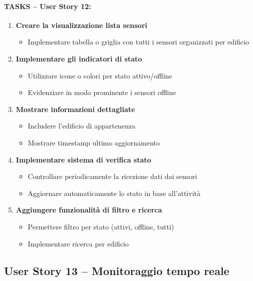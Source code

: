 \paragraph*{TASKS – User Story 12:}
\begin{enumerate}
    \item \textbf{Creare la visualizzazione lista sensori}
    \begin{itemize}
        \item Implementare tabella o griglia con tutti i sensori organizzati per edificio
    \end{itemize}
    \item \textbf{Implementare gli indicatori di stato}
    \begin{itemize}
        \item Utilizzare icone o colori per stato attivo/offline
        \item Evidenziare in modo prominente i sensori offline
    \end{itemize}
    \item \textbf{Mostrare informazioni dettagliate}
    \begin{itemize}
        \item Includere l'edificio di appartenenza
        \item Mostrare timestamp ultimo aggiornamento
    \end{itemize}
    \item \textbf{Implementare sistema di verifica stato}
    \begin{itemize}
        \item Controllare periodicamente la ricezione dati dai sensori
        \item Aggiornare automaticamente lo stato in base all'attività
    \end{itemize}
    \item \textbf{Aggiungere funzionalità di filtro e ricerca}
    \begin{itemize}
        \item Permettere filtro per stato (attivi, offline, tutti)
        \item Implementare ricerca per edificio
    \end{itemize}
\end{enumerate}


\subsection{User Story 13 – Monitoraggio tempo reale}
\label{us:monitoraggioTempoReale}

